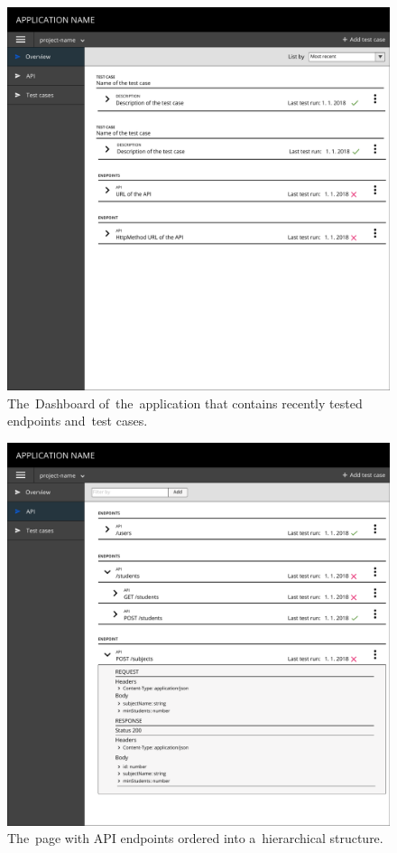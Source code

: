 \begin{figure}[!hbt]
	\centering
	\includegraphics[scale=0.57]{./designs/overview.pdf}
	\caption{The~Dashboard of~the~application that contains recently tested
	endpoints and~test cases.}
	\label{figOverview}
\end{figure}

\begin{figure}[!hbt]
	\centering
	\includegraphics[scale=0.57]{./designs/apiContainer.pdf}
	\caption{The~page with API endpoints ordered into a~hierarchical structure.}
	\label{figAPI}
\end{figure}

